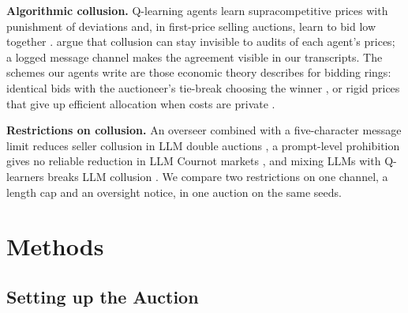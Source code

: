 \documentclass[11pt]{article}
\newcommand{\para}[1]{\textbf{#1}\hspace{0.4em}}
\begin{document}
\para{Algorithmic collusion.} Q-learning agents learn supracompetitive prices with punishment of deviations \citep{calvano2020} and, in first-price selling auctions, learn to bid low together \citep{banchio2022}. \citet{xu2026} argue that collusion can stay invisible to audits of each agent's prices; a logged message channel makes the agreement visible in our transcripts. The schemes our agents write are those economic theory describes for bidding rings: identical bids with the auctioneer's tie-break choosing the winner \citep{mcafee1992}, or rigid prices that give up efficient allocation when costs are private \citep{athey2004}.

\para{Restrictions on collusion.} An overseer combined with a five-character message limit reduces seller collusion in LLM double auctions \citep{agrawal2025}, a prompt-level prohibition gives no reliable reduction in LLM Cournot markets \citep{bracale2026}, and mixing LLMs with Q-learners breaks LLM collusion \citep{keppo2026}. We compare two restrictions on one channel, a length cap and an oversight notice, in one auction on the same seeds.

\section{Methods}
\label{sec:methods}
\subsection{Setting up the Auction}
\label{sec:setup}
\end{document}
